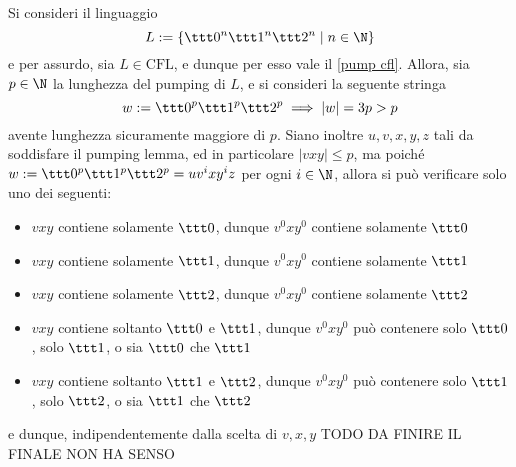 \documentclass[a4paper, 12pt]{report}
\begin{document}

    \begin{example}
        \label{pump cfl ex1}
        Si consideri il linguaggio $$L := \{\ttt 0 ^n \ttt 1 ^n \ttt 2 ^n \mid n \in \N\}$$ e per assurdo, sia $L \in \mathrm{CFL}$, e dunque per esso vale il \cref{pump cfl}. Allora, sia $p \in \N$ la lunghezza del pumping di $L$, e si consideri la seguente stringa $$w:=\ttt 0^p \ttt 1^p \ttt 2 ^p \implies |w| = 3p > p$$ avente lunghezza sicuramente maggiore di $p$. Siano inoltre $u, v, x, y, z$ tali da soddisfare il pumping lemma, ed in particolare $|vxy| \le p$, ma poiché $w := \ttt 0^p \ttt 1 ^p \ttt 2^p = uv^ixy^iz$ per ogni $i \in \N$, allora si può verificare solo uno dei seguenti:

        \begin{itemize}
            \item $vxy$ contiene solamente $\ttt 0$, dunque $v^0xy^0$ contiene solamente $\ttt 0$
            \item $vxy$ contiene solamente $\ttt 1$, dunque $v^0xy^0$ contiene solamente $\ttt 1$
            \item $vxy$ contiene solamente $\ttt 2$, dunque $v^0xy^0$ contiene solamente $\ttt 2$
            \item $vxy$ contiene soltanto $\ttt 0$ e $\ttt 1$, dunque $v^0xy^0$ può contenere solo $\ttt 0$, solo $\ttt 1$, o sia $\ttt 0$ che $\ttt 1$
            \item $vxy$ contiene soltanto $\ttt 1$ e $\ttt 2$, dunque $v^0xy^0$ può contenere solo $\ttt 1$, solo $\ttt 2$, o sia $\ttt 1$ che $\ttt 2$
        \end{itemize}
        
        e dunque, indipendentemente dalla scelta di $v, x, y$ TODO DA FINIRE IL FINALE NON HA SENSO
    \end{example}
\end{document}
